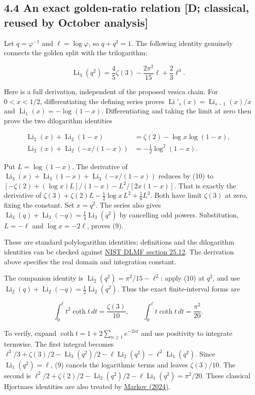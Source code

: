 \documentclass[11pt,a4paper]{article}
\begin{document}
\subsection*{4.4 An exact golden-ratio relation [D; classical, reused by October analysis]}

Let $q=\varphi^{-1}$ and $\ell=\log\varphi$, so $q+q^2=1$. The following identity genuinely connects the golden split with the trilogarithm:


\[
\operatorname{Li}_3(q^2)=
\frac45\zeta(3)-\frac{2\pi^2}{15}\ell+\frac23\ell^3. \tag{9}
\]

Here is a full derivation, independent of the proposed vesica chain. For $0<x<1/2$, differentiating the defining series proves
$\operatorname{Li}'_s(x)=\operatorname{Li}_{s-1}(x)/x$ and $\operatorname{Li}_1(x)=-\log(1-x)$. Differentiating and taking the limit at zero then prove the two dilogarithm identities


\[
\begin{aligned}
\operatorname{Li}_2(x)+\operatorname{Li}_2(1-x)&=\zeta(2)-\log x\log(1-x),\\
\operatorname{Li}_2(x)+\operatorname{Li}_2(-x/(1-x))&=-\tfrac12\log^2(1-x).
\end{aligned} \tag{10}
\]

Put $L=\log(1-x)$. The derivative of
$\operatorname{Li}_3(x)+\operatorname{Li}_3(1-x)+\operatorname{Li}_3(-x/(1-x))$
reduces by (10) to
$[-\zeta(2)+(\log x)L]/(1-x)-L^2/[2x(1-x)]$.
That is exactly the derivative of
$\zeta(3)+\zeta(2)L-\tfrac12\log x\,L^2+\tfrac16L^3$.
Both have limit $\zeta(3)$ at zero, fixing the constant.
Set $x=q^2$. The series also gives
$\operatorname{Li}_3(q)+\operatorname{Li}_3(-q)=\tfrac14\operatorname{Li}_3(q^2)$
by cancelling odd powers. Substitution, $L=-\ell$ and $\log x=-2\ell$, proves (9).


These are standard polylogarithm identities; definitions and the dilogarithm identities can be checked against \href{https://dlmf.nist.gov/25.12}{NIST DLMF section 25.12}. The derivation above specifies the real domain and integration constant.


The companion identity is $\operatorname{Li}_2(q^2)=\pi^2/15-\ell^2$: apply (10) at $q^2$, and use $\operatorname{Li}_2(q)+\operatorname{Li}_2(-q)=\tfrac12\operatorname{Li}_2(q^2)$. Thus the exact finite-interval forms are


\[
\int_0^\ell t^2\coth t\,dt=\frac{\zeta(3)}{10},
\qquad \int_0^\ell t\coth t\,dt=\frac{\pi^2}{20}. \tag{11}
\]

To verify, expand $\coth t=1+2\sum_{n\geq1}e^{-2nt}$ and use positivity to integrate termwise. The first integral becomes
$\ell^3/3+\zeta(3)/2-\operatorname{Li}_3(q^2)/2
-\ell\operatorname{Li}_2(q^2)-\ell^2\operatorname{Li}_1(q^2)$.
Since $\operatorname{Li}_1(q^2)=\ell$, (9) cancels the logarithmic terms and leaves $\zeta(3)/10$.
The second is $\ell^2/2+\zeta(2)/2-\operatorname{Li}_2(q^2)/2-\ell\operatorname{Li}_1(q^2)=\pi^2/20$.
These classical Hjortnaes identities are also treated by \href{https://www.diogenes.bg/ijam/contents/2024-37-3/2/2.pdf}{Markov (2024)}.
\end{document}

